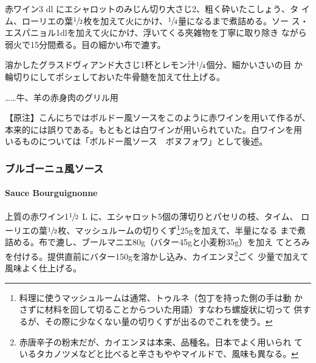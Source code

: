 \documentclass[twoside,12Q,b5j]{escoffierltjsbook}
\newenvironment{recette}{\begin{small}\begin{spacing}{1}\begin{multicols}{2}}{\end{multicols}\end{spacing}\end{small}}
\begin{document}
\begin{recette}

赤ワイン3 dl にエシャロットのみじん切り大さじ2、粗く砕いたこしょう、タ
イム、ローリエの葉\(\sfrac{1}{2}\)枚を加えて火にかけ、\(\sfrac{1}{4}\)量になるまで煮詰める。ソー
ス・エスパニョル1dlを加えて火にかけ、浮いてくる夾雑物を丁寧に取り除き
ながら弱火で15分間煮る。目の細かい布で漉す。

溶かしたグラスドヴィアンド大さじ1杯とレモン汁\(\sfrac{1}{4}\)個分、細かいさいの目
か輪切りにしてポシェしておいた牛骨髄を加えて仕上げる。

\ldots{}\ldots{}牛、羊の赤身肉のグリル用

【原注】こんにちではボルドー風ソースをこのように赤ワインを用いて作るが、
本来的には誤りである。もともとは白ワインが用いられていた。白ワインを用
いるものについては「ボルドー風ソース　ボヌフォワ」として後述。

\vspace*{1.7\zw}

\subsubsection{ブルゴーニュ風ソース}\label{ux30d6ux30ebux30b4ux30fcux30cbux30e5ux98a8ux30bdux30fcux30b9}

\paragraph{Sauce Bourguignonne}\label{sauce-bourgignonne}


上質の赤ワイン1\(\sfrac{1}{2}\) L
に、エシャロット5個の薄切りとパセリの枝、タイム、
ローリエの葉\(\sfrac{1}{2}\)枚、マッシュルームの切りくず\footnote{料理に使うマッシュルームは通常、トゥルネ（包丁を持った側の手は動
  かさずに材料を回して切ることからついた用語）すなわち螺旋状に切って
  供するが、その際に少なくない量の切りくずが出るのでこれを使う。}25gを加えて、半量になる
まで煮詰める。布で漉し、ブールマニエ80g（バター45gと小麦粉35g）を加え
てとろみを付ける。提供直前にバター150gを溶かし込み、カイエンヌ\footnote{赤唐辛子の粉末だが、カイエンヌは本来、品種名。日本でよく用いられ
  ているタカノツメなどと比べると辛さもややマイルドで、風味も異なる。}ごく
少量で加えて風味よく仕上げる。


\end{recette}
\end{document}

